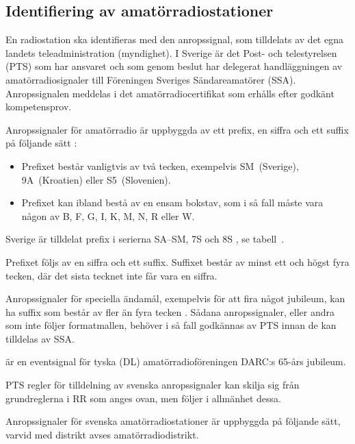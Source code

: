 \subsection{Identifiering av amatörradiostationer}

En radiostation ska identifieras med den anropssignal, som tilldelats av det
egna landets teleadministration (myndighet).
I Sverige är det Post- och telestyrelsen (PTS) som har ansvaret och som genom
beslut har delegerat handläggningen av amatörradiosignaler till Föreningen
Sveriges Sändareamatörer (SSA).
Anropssignalen meddelas i det amatörradiocertifikat som erhålls efter godkänt
kompetensprov.

Anropssignaler för amatörradio är uppbyggda av ett prefix, en siffra och ett
suffix på följande sätt \cite[\S19.68, \S19.69]{ITU-RR}:

\begin{itemize}
\item Prefixet består vanligtvis av två tecken, exempelvis SM~(Sverige), 9A~(Kroatien)
eller S5~(Slovenien).
\item Prefixet kan ibland bestå av en ensam bokstav, som i så fall måste vara någon
av B, F, G, I, K, M, N, R eller W.
\end{itemize}

Sverige är tilldelat prefix i serierna SA--SM, 7S och 8S
\cite[Appendix 42]{ITU-RR}, se tabell~.

Prefixet följs av en siffra och ett suffix. Suffixet består av minst ett och
högst fyra tecken, där det sista tecknet inte får vara en siffra.

Anropssignaler för speciella ändamål, exempelvis för att fira något jubileum,
kan ha suffix som består av fler än fyra tecken \cite[\S19.68A]{ITU-RR}.
Sådana anropssignaler, eller andra som inte följer formatmallen, behöver i så
fall godkännas av PTS innan de kan tilldelas av SSA.

\begin{tcolorbox}[title=Exempel]
 är en eventsignal för tyska (DL) amatörradioföreningen
DARC:s 65-års jubileum.
\end{tcolorbox}

PTS regler för tilldelning av svenska anropssignaler kan skilja sig från
grundreglerna i RR som anges ovan, men följer i allmänhet dessa.

Anropssignaler för svenska amatörradiostationer är uppbyggda på följande
sätt, varvid med distrikt avses amatörradiodistrikt.


